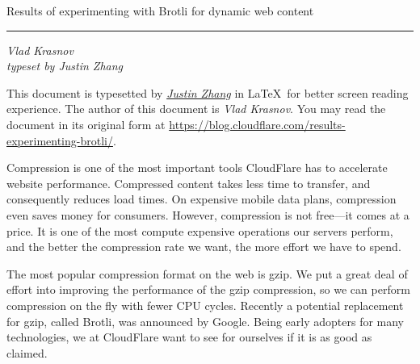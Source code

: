 \documentclass[12pt]{article}
\newcommand{\mytitle}[1]{
  {\Huge #1}\par
}
\newcommand{\mysubtitle}[1]{
  {\emph{#1}}\par
}
\begin{document}
\begin{titlepage}
\begin{minipage}{0.8\linewidth}
  \vspace*{4cm}
  \begin{center}
    \noindent
    \mytitle{Results of experimenting with Brotli for dynamic web
    content}
    \rule{\linewidth}{0.2ex}\par
    \mysubtitle{Vlad Krasnov \\ typeset by Justin Zhang}
  \end{center}
\end{minipage}
\null \vfill
\hfill
\begin{minipage}{0.55\linewidth}
  \begin{flushright}
  \end{flushright}
\end{minipage}
%
\titlepagedecoration
\end{titlepage}

\newpage
\tableofcontents

\newpage
This document is typesetted by
\href{mailto:schnell18@gmail.com}{\emph{Justin Zhang}} in \LaTeX\ for
better screen reading experience. The author of this document is
\emph{Vlad Krasnov}. You may read the document in its original form at
\href{https://blog.cloudflare.com/results-experimenting-brotli/}{https://blog.cloudflare.com/results-experimenting-brotli/}.

\newpage

Compression is one of the most important tools CloudFlare has to
accelerate website performance. Compressed content takes less time to
transfer, and consequently reduces load times. On expensive mobile data
plans, compression even saves money for consumers. However, compression
is not free—it comes at a price. It is one of the most compute expensive
operations our servers perform, and the better the compression rate we
want, the more effort we have to spend.

The most popular compression format on the web is gzip. We put a great
deal of effort into improving the performance of the gzip compression,
so we can perform compression on the fly with fewer CPU cycles. Recently
a potential replacement for gzip, called Brotli, was announced by
Google. Being early adopters for many technologies, we at CloudFlare
want to see for ourselves if it is as good as claimed.
\end{document}
